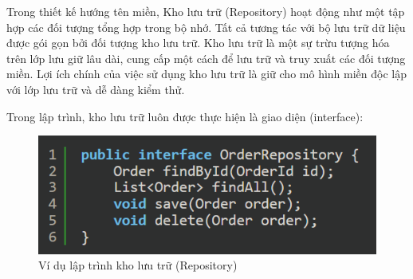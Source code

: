  Trong thiết kế hướng tên miền,       Kho lưu trữ (Repository)        hoạt động như một tập hợp các đối tượng tổng hợp trong bộ nhớ.      Tất cả     tương tác với bộ lưu trữ dữ liệu được gói gọn bởi đối tượng kho lưu trữ.    Kho lưu trữ    là một sự trừu tượng hóa trên lớp lưu giữ lâu dài, cung cấp một cách để lưu trữ và truy xuất các đối tượng miền.       Lợi ích chính của việc sử dụng kho lưu trữ là   giữ cho mô hình miền độc lập với lớp lưu trữ và dễ dàng kiểm thử.
 
 

 
 
 
  
 
 
 
 





 


\begin{example} Trong lập trình,  kho lưu trữ luôn được thực hiện là giao diện (interface):

    
\begin{figure}[H]

    \centering
    
    \includegraphics[scale = 0.8]{pictures/_vi_du_lap_trinh_kho_luu_tru_repository/main.png}
    
    \caption{Ví dụ  lập trình  kho lưu trữ (Repository)}
    
    \end{figure}
\end{example}